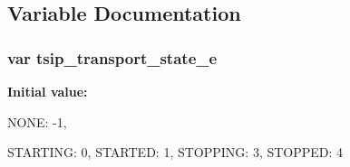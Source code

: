\subsection{Variable Documentation}
\subsubsection[{tsip\-\_\-transport\-\_\-state\-\_\-e}]{\setlength{\rightskip}{0pt plus 5cm}var tsip\-\_\-transport\-\_\-state\-\_\-e}\label{tsip__stack_8js_a72937d196e6ae581dce50280bd23dd64}
{\bfseries Initial value\-:}
\begin{DoxyCode}

{
    NONE: -1,

    STARTING: 0,
    STARTED: 1,
    STOPPING: 3,
    STOPPED: 4
}
\end{DoxyCode}
